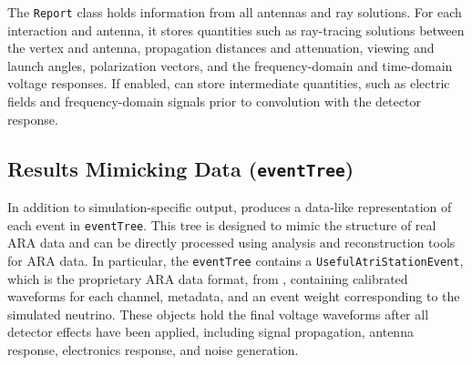         The \texttt{Report} class holds information from all antennas and ray solutions.
        For each interaction and antenna, it stores quantities such as ray-tracing solutions between the vertex and antenna, propagation distances and attenuation, viewing and launch angles, polarization vectors, and the frequency-domain and time-domain voltage responses.
        If enabled, \arasim{} can store intermediate quantities, such as electric fields and frequency-domain signals prior to convolution with the detector response.
        
        \subsection{Results Mimicking Data (\texttt{eventTree})}
        
        In addition to simulation-specific output, \arasim{} produces a data-like representation of each event in \texttt{eventTree}.
        This tree is designed to mimic the structure of real ARA data and can be directly processed using analysis and reconstruction tools for ARA data.
        In particular, the \texttt{eventTree} contains a \texttt{UsefulAtriStationEvent}, which is the proprietary ARA data format,
        from \araroot{}, containing calibrated waveforms for each channel, 
        metadata, and an event weight corresponding to the simulated neutrino.
        These objects hold the final voltage waveforms after all detector effects have been applied, including signal propagation, antenna response, electronics response, and noise generation.

